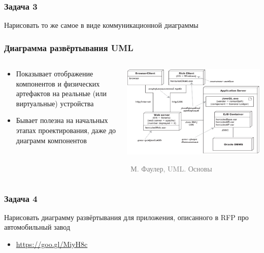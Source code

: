 \documentclass[xetex,mathserif,serif]{beamer}
\newcommand{\attribution}[1] {
	\vspace{-5mm}\begin{flushright}\begin{scriptsize}\textcolor{gray}{\textcopyright\, #1}\end{scriptsize}\end{flushright}
}
\begin{document}
	\begin{frame}
		\frametitle{Задача 3}
		Нарисовать то же самое в виде коммуникационной диаграммы
	\end{frame}

	\begin{frame}
		\frametitle{Диаграмма развёртывания UML}
		\begin{columns}
			\begin{column}{0.5\textwidth}
				\begin{itemize}
					\item Показывает отображение компонентов и физических артефактов на реальные (или виртуальные) устройства
					\item Бывает полезна на начальных этапах проектирования, даже до диаграмм компонентов
				\end{itemize}
			\end{column}
			\begin{column}{0.5\textwidth}
				\begin{center}
					\includegraphics[width=\textwidth]{deploymentDiagram.png}
					\attribution{М. Фаулер, UML. Основы}
				\end{center}
			\end{column}
		\end{columns}
	\end{frame}

	\begin{frame}
		\frametitle{Задача 4}
		Нарисовать диаграмму развёртывания для приложения, описанного в RFP про автомобильный завод
		\begin{itemize}
			\item \url{https://goo.gl/MiyH8c}
		\end{itemize}
	\end{frame}
\end{document}
